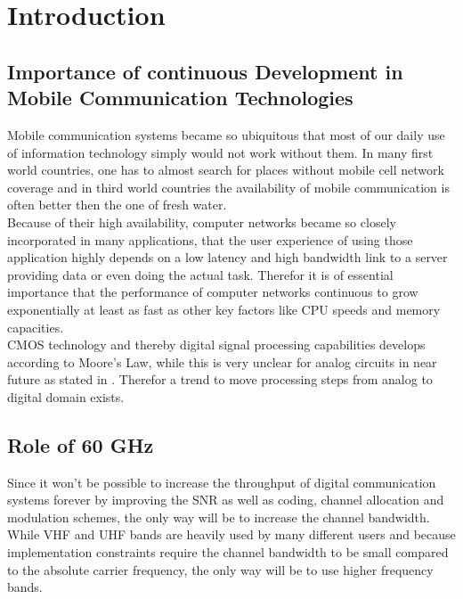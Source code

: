 \chapter{Introduction}
\label{ch:introduction}

\section{Importance of continuous Development in
  Mobile Communication Technologies}

Mobile communication systems became so ubiquitous that most of our daily
use of information technology simply would not work without them.
In many first world countries, one has to almost search for places without
mobile cell network coverage and in third world countries the availability of
mobile communication is often better then the one of fresh water. \\

Because of their high availability, computer networks became so closely
incorporated in many applications, that the user experience of using those
application highly depends on a low latency and high bandwidth link
to a server providing data or even doing the actual task.
Therefor it is of essential importance that
the performance of computer networks continuous \cite{web_content_delivery}
to grow exponentially at least as fast as other key factors like
\gls{CPU} speeds and memory capacities. \\

\acrshort{CMOS} technology and thereby digital signal processing capabilities
develops according to Moore's Law, while this is very unclear for analog
circuits in near future as stated in \cite{belgium}.
Therefor a trend to move processing steps from analog to digital
domain exists. \\

\section{Role of 60 GHz}
Since it won't be possible to increase the throughput of digital communication
systems forever by improving the \gls{SNR} as well as coding, channel allocation
and modulation schemes, the only way will be to increase the channel bandwidth.
While \gls{VHF} and \gls{UHF} bands are heavily used by many different
users and because implementation constraints require the channel
bandwidth to be small compared to the absolute carrier frequency,
the only way will be to use higher frequency bands. \\

